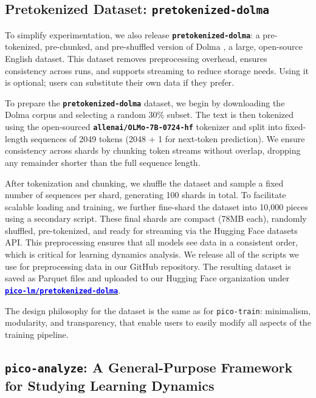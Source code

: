 \subsection{Pretokenized Dataset: \texttt{pretokenized-dolma}}

To simplify experimentation, we also release \textbf{\texttt{pretokenized-dolma}}: a pre-tokenized, pre-chunked, and pre-shuffled version of Dolma \citep{soldaini2024dolma}, a large, open-source English dataset. This dataset removes preprocessing overhead, ensures consistency across runs, and supports streaming to reduce storage needs. Using it is optional; users can substitute their own data if they prefer. 

To prepare the \textbf{\texttt{pretokenized-dolma}} dataset, we begin by downloading the Dolma corpus and selecting a random 30\% subset. The text is then tokenized using the open-sourced \textbf{\texttt{allenai/OLMo-7B-0724-hf}} tokenizer and split into fixed-length sequences of 2049 tokens (2048 + 1 for next-token prediction). We ensure consistency across shards by chunking token streams without overlap, dropping any remainder shorter than the full sequence length.

After tokenization and chunking, we shuffle the dataset and sample a fixed number of sequences per shard, generating 100 shards in total. To facilitate scalable loading and training, we further fine-shard the dataset into 10,000 pieces using a secondary script. These final shards are compact (78MB each), randomly shuffled, pre-tokenized, and ready for streaming via the Hugging Face datasets API. This preprocessing ensures that all models see data in a consistent order, which is critical for learning dynamics analysis. We release all of the scripts we use for preprocessing data in our GitHub repository. The resulting dataset is saved as Parquet files and uploaded to our Hugging Face organization under \href{https://huggingface.co/datasets/pico-lm/pretokenized-dolma}{\textcolor{blue}{\textbf{\texttt{pico-lm/pretokenized-dolma}}}}.

The design philosophy for the dataset is the same as for \texttt{pico-train}: minimalism, modularity, and transparency, that enable users to easily modify all aspects of the training pipeline. 

\subsection{\texttt{pico-analyze}: A General-Purpose Framework for Studying Learning Dynamics}

